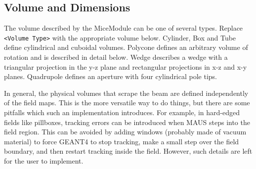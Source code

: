 \subsection{Volume and Dimensions}
The volume described by the MiceModule can be one of several types. Replace \verb|<Volume Type>| with the
appropriate volume below. Cylinder, Box and Tube define cylindrical and cuboidal volumes.
Polycone defines an arbitrary volume of rotation and is described in detail below. Wedge describes a wedge with a
triangular projection in the y-z plane and rectangular projections in x-z and x-y planes. Quadrupole defines an
aperture with four cylindrical pole tips.

In general, the physical volumes that scrape the beam are defined independently of the field maps. This is the more
versatile way to do things, but there are some pitfalls which such an implementation introduces. For example, in
hard-edged fields like pillboxes, tracking errors can be introduced when MAUS steps into the field region. This can
be avoided by adding windows (probably made of vacuum material) to force GEANT4 to stop tracking, make a small step
over the field boundary, and then restart tracking inside the field. However, such details are left for the user to
implement.

